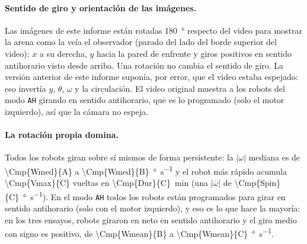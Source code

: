 \paragraph{Sentido de giro y orientación de las imágenes.} Las imágenes de este informe están rotadas
\SI{180}{\degree} respecto del video para mostrar la arena como la veía el observador (parado del lado del
borde superior del video): $x$ a su derecha, $y$ hacia la pared de enfrente y giros positivos en sentido
antihorario visto desde arriba. Una rotación no cambia el sentido de giro. La versión anterior de este
informe suponía, por error, que el video estaba espejado: eso invertía $y$, $\theta$, $\omega$ y la
circulación. El video original muestra a los robots del modo \texttt{AH} girando en sentido antihorario,
que es lo programado (solo el motor izquierdo), así que la cámara no espeja.

\paragraph{La rotación propia domina.} Todos los robots giran sobre sí mismos de forma persistente:
la $|\omega|$ mediana es de \num{\Cmp{Wmed}{A}} a \SI{\Cmp{Wmed}{B}}{\degree\per\second} y el robot
más rápido acumula \num{\Cmp{Vmax}{C}} vueltas en \SI{\Cmp{Dur}{C}}{\minute} (una $|\overline{\omega}|$
de \SI{\Cmp{Spin}{C}}{\degree\per\second}). En el modo \texttt{AH} todos los robots están programados
para girar en sentido antihorario (solo con el motor izquierdo), y eso es lo que hace la mayoría: en los
tres ensayos,  robots giraron en neto en sentido antihorario y el giro medio con signo es
positivo, de \num{\Cmp{Wmean}{B}} a \SI{\Cmp{Wmean}{C}}{\degree\per\second}.

